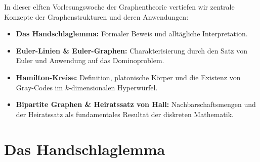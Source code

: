 \begin{nice-box}
In dieser elften Vorlesungswoche der Graphentheorie vertiefen wir zentrale Konzepte der Graphenstrukturen und deren Anwendungen:
\begin{itemize}
    \item \textbf{Das Handschlaglemma:} Formaler Beweis und alltägliche Interpretation.
    \item \textbf{Euler-Linien \& Euler-Graphen:} Charakterisierung durch den Satz von Euler und Anwendung auf das Dominoproblem.
    \item \textbf{Hamilton-Kreise:} Definition, platonische Körper und die Existenz von Gray-Codes im $k$-dimensionalen Hyperwürfel.
    \item \textbf{Bipartite Graphen \& Heiratssatz von Hall:} Nachbarschaftsmengen und der Heiratssatz als fundamentales Resultat der diskreten Mathematik.
\end{itemize}
\end{nice-box}

\section{Das Handschlaglemma}


